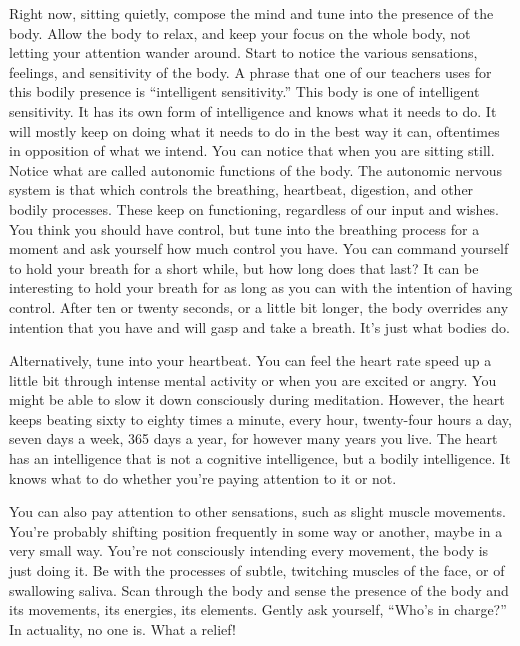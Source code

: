 Right now, sitting quietly, compose the mind and tune into the presence of the body. Allow the body to relax, and keep your focus on the whole body, not letting your attention wander around. Start to notice the various sensations, feelings, and sensitivity of the body. A phrase that one of our teachers uses for this bodily presence is ``intelligent sensitivity.'' This body is one of intelligent sensitivity. It has its own form of intelligence and knows what it needs to do. It will mostly keep on doing what it needs to do in the best way it can, oftentimes in opposition of what we intend. You can notice that when you are sitting still. Notice what are called autonomic functions of the body. The autonomic nervous system is that which controls the breathing, heartbeat, digestion, and other bodily processes. These keep on functioning, regardless of our input and wishes. You think you should have control, but tune into the breathing process for a moment and ask yourself how much control you have. You can command yourself to hold your breath for a short while, but how long does that last? It can be interesting to hold your breath for as long as you can with the intention of having control. After ten or twenty seconds, or a little bit longer, the body overrides any intention that you have and will gasp and take a breath. It's just what bodies do.

Alternatively, tune into your heartbeat. You can feel the heart rate speed up a little bit through intense mental activity or when you are excited or angry. You might be able to slow it down consciously during meditation. However, the heart keeps beating sixty to eighty times a minute, every hour, twenty-four hours a day, seven days a week, 365 days a year, for however many years you live. The heart has an intelligence that is not a cognitive intelligence, but a bodily intelligence. It knows what to do whether you're paying attention to it or not.

You can also pay attention to other sensations, such as slight muscle movements. You're probably shifting position frequently in some way or another, maybe in a very small way. You're not consciously intending every movement, the body is just doing it. Be with the processes of subtle, twitching muscles of the face, or of swallowing saliva. Scan through the body and sense the presence of the body and its movements, its energies, its elements. Gently ask yourself, ``Who's in charge?'' In actuality, no one is. What a relief!

